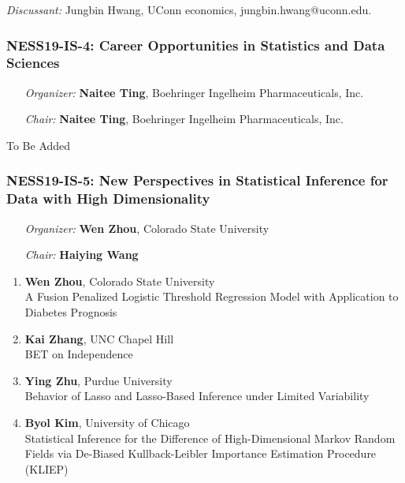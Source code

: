 \emph{Discussant:} Jungbin Hwang, UConn economics, jungbin.hwang@uconn.edu.

\subsubsection*{NESS19-IS-4: Career Opportunities in Statistics and Data Sciences}

\begin{enumerate}[align=left]
\item [\emph{Organizer:}] \textbf{Naitee Ting}, Boehringer Ingelheim Pharmaceuticals, Inc. \\
\item [\emph{Chair:}] \textbf{Naitee Ting}, Boehringer Ingelheim Pharmaceuticals, Inc.
\end{enumerate}

To Be Added

\subsubsection*{NESS19-IS-5: New Perspectives in Statistical Inference for Data with High Dimensionality}

\begin{enumerate}[align=left]
\item [\emph{Organizer:}] \textbf{Wen Zhou}, Colorado State University \\
\item [\emph{Chair:}] \textbf{Haiying Wang}
\end{enumerate}

\begin{enumerate}
\item \textbf{Wen Zhou}, Colorado State University \\
A Fusion Penalized Logistic Threshold Regression Model with Application to Diabetes Prognosis
\item \textbf{Kai Zhang}, UNC Chapel Hill \\
BET on Independence
\item \textbf{Ying Zhu}, Purdue University \\
Behavior of Lasso and Lasso-Based Inference under Limited Variability
\item \textbf{Byol Kim}, University of Chicago \\
Statistical Inference for the Difference of High-Dimensional Markov Random Fields via De-Biased Kullback-Leibler Importance Estimation Procedure (KLIEP)
\end{enumerate}


